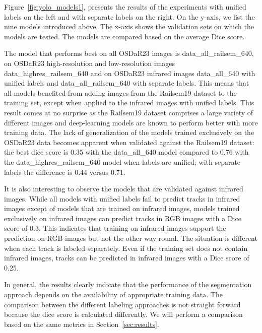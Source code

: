 \documentclass[Master,MDS,english]{BASE/twbook} %
\begin{document}
Figure~\ref{fig:yolo_models1}, presents the results of the experiments with unified labels on the left and with separate labels on the right. On the y-axis, we list the nine models introduced above. The x-axis shows the validation sets on which the models are tested. The models are compared based on the average Dice score.

 The model that performs best on all OSDaR23 images is data\_all\_railsem\_640, on OSDaR23 high-resolution and low-resolution images data\_highres\_railsem\_640 and on OSDaR23 infrared images data\_all\_640 with unified labels and  data\_all\_railsem\_640 with separate labels. This means that all models benefited from adding images from the Railsem19 dataset to the training set, except when applied to the infrared images with unified labels. This result comes at no surprise as the Railsem19 dataset comprises a large variety of different images and deep-learning models are known to perform better with more training data. 
 The lack of generalization of the models trained exclusively on the OSDaR23 data becomes apparent when validated against the Railsem19 dataset: the best dice score is 0.35 with the data\_all\_640 model compared to 0.76 with the data\_highres\_railsem\_640 model when labels are unified; with separate labels the difference is 0.44 versus 0.71.

 It is also interesting to observe the models that are validated against infrared images. While all models with unified labels fail to predict tracks in infrared images except of models that are trained on infrared images, models trained exclusively on infrared images can predict tracks in RGB images with a Dice score of 0.3. This indicates that training on infrared images support the prediction on RGB images but not the other way round. The situation is different when each track is labeled separately. Even if the training set does not contain infrared images, tracks can be predicted in infrared images with a Dice score of 0.25.

In general, the results clearly indicate that the performance of the segmentation approach depends on the availability of appropriate training data. The comparison between the different labeling approaches is not straight forward because the dice score is calculated differently. We will perform a comparison based on the same metrics in Section~\ref{sec:results}.


 
\end{document}
